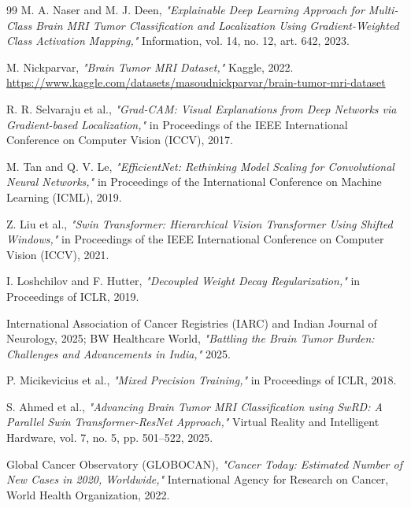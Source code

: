 \documentclass[12pt,a4paper,oneside]{report}
\begin{document}
\begin{thebibliography}{99}
M. A. Naser and M. J. Deen,
\textit{"Explainable Deep Learning Approach for Multi-Class Brain MRI
Tumor Classification and Localization Using Gradient-Weighted Class
Activation Mapping,"}
Information, vol. 14, no. 12, art. 642, 2023.

M. Nickparvar,
\textit{"Brain Tumor MRI Dataset,"}
Kaggle, 2022.
\url{https://www.kaggle.com/datasets/masoudnickparvar/brain-tumor-mri-dataset}

R. R. Selvaraju et al.,
\textit{"Grad-CAM: Visual Explanations from Deep Networks via
Gradient-based Localization,"}
in Proceedings of the IEEE International Conference on Computer Vision
(ICCV), 2017.

M. Tan and Q. V. Le,
\textit{"EfficientNet: Rethinking Model Scaling for Convolutional Neural
Networks,"}
in Proceedings of the International Conference on Machine Learning
(ICML), 2019.

Z. Liu et al.,
\textit{"Swin Transformer: Hierarchical Vision Transformer Using Shifted
Windows,"}
in Proceedings of the IEEE International Conference on Computer Vision
(ICCV), 2021.

I. Loshchilov and F. Hutter,
\textit{"Decoupled Weight Decay Regularization,"}
in Proceedings of ICLR, 2019.

International Association of Cancer Registries (IARC) and Indian Journal
of Neurology, 2025;
BW Healthcare World,
\textit{"Battling the Brain Tumor Burden: Challenges and Advancements in
India,"} 2025.

P. Micikevicius et al.,
\textit{"Mixed Precision Training,"}
in Proceedings of ICLR, 2018.

S. Ahmed et al.,
\textit{"Advancing Brain Tumor MRI Classification using SwRD: A Parallel
Swin Transformer-ResNet Approach,"}
Virtual Reality and Intelligent Hardware,
vol. 7, no. 5, pp. 501--522, 2025.

Global Cancer Observatory (GLOBOCAN),
\textit{"Cancer Today: Estimated Number of New Cases in 2020, Worldwide,"}
International Agency for Research on Cancer, World Health Organization,
2022.

\end{thebibliography}
\end{document}
